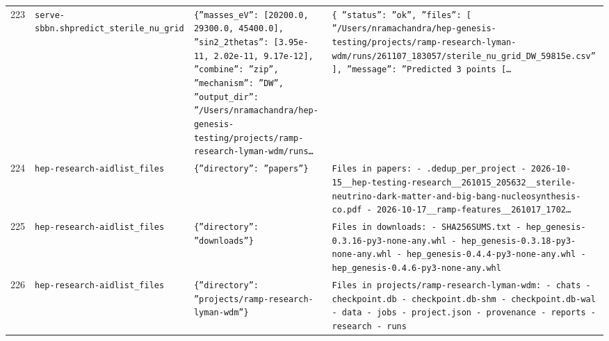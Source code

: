 \documentclass[11pt,a4paper]{article}
\begin{document}
\begin{longtable}{@{}p{}p{}p{}p{}@{}}
223 & \texttt{serve-sbbn.sh}\newline\texttt{predict\_\allowbreak{}sterile\_\allowbreak{}nu\_\allowbreak{}grid} & \texttt{\{''masses\_\allowbreak{}eV'':\allowbreak{} [20200.0,\allowbreak{} 29300.0,\allowbreak{} 45400.0]\allowbreak{},\allowbreak{} ''sin2\_\allowbreak{}2thetas'':\allowbreak{} [3.95e-11,\allowbreak{} 2.02e-11,\allowbreak{} 9.17e-12]\allowbreak{},\allowbreak{} ''combine'':\allowbreak{} ''zip'',\allowbreak{} ''mechanism'':\allowbreak{} ''DW'',\allowbreak{} ''output\_\allowbreak{}dir'':\allowbreak{} ''/\allowbreak{}Users/\allowbreak{}nramachandra/\allowbreak{}hep-genesis-testing/\allowbreak{}projects/\allowbreak{}ramp-research-lyman-wdm/\allowbreak{}runs\ldots{}\allowbreak{}} & \texttt{\{   ''status'':\allowbreak{} ''ok'',\allowbreak{}   ''files'':\allowbreak{} [     ''/\allowbreak{}Users/\allowbreak{}nramachandra/\allowbreak{}hep-genesis-testing/\allowbreak{}projects/\allowbreak{}ramp-research-lyman-wdm/\allowbreak{}runs/\allowbreak{}261107\_\allowbreak{}183057/\allowbreak{}sterile\_\allowbreak{}nu\_\allowbreak{}grid\_\allowbreak{}DW\_\allowbreak{}59815e.csv''   ]\allowbreak{},\allowbreak{}   ''message'':\allowbreak{} ''Predicted 3 points [\ldots{}\allowbreak{}} \\
224 & \texttt{hep-research-aid}\newline\texttt{list\_\allowbreak{}files} & \texttt{\{''directory'':\allowbreak{} ''papers''\}\allowbreak{}} & \texttt{Files in papers:\allowbreak{}   - .dedup\_\allowbreak{}per\_\allowbreak{}project   - 2026-10-15\_\allowbreak{}\_\allowbreak{}hep-testing-research\_\allowbreak{}\_\allowbreak{}261015\_\allowbreak{}205632\_\allowbreak{}\_\allowbreak{}sterile-neutrino-dark-matter-and-big-bang-nucleosynthesis-co.pdf   - 2026-10-17\_\allowbreak{}\_\allowbreak{}ramp-features\_\allowbreak{}\_\allowbreak{}261017\_\allowbreak{}1702\ldots{}\allowbreak{}} \\
225 & \texttt{hep-research-aid}\newline\texttt{list\_\allowbreak{}files} & \texttt{\{''directory'':\allowbreak{} ''downloads''\}\allowbreak{}} & \texttt{Files in downloads:\allowbreak{}   - SHA256SUMS.txt   - hep\_\allowbreak{}genesis-0.3.16-py3-none-any.whl   - hep\_\allowbreak{}genesis-0.3.18-py3-none-any.whl   - hep\_\allowbreak{}genesis-0.4.4-py3-none-any.whl   - hep\_\allowbreak{}genesis-0.4.6-py3-none-any.whl} \\
226 & \texttt{hep-research-aid}\newline\texttt{list\_\allowbreak{}files} & \texttt{\{''directory'':\allowbreak{} ''projects/\allowbreak{}ramp-research-lyman-wdm''\}\allowbreak{}} & \texttt{Files in projects/\allowbreak{}ramp-research-lyman-wdm:\allowbreak{}   - chats   - checkpoint.db   - checkpoint.db-shm   - checkpoint.db-wal   - data   - jobs   - project.json   - provenance   - reports   - research   - runs} \\

\end{longtable}
\end{document}
